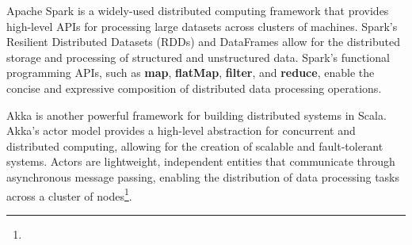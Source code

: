 Apache Spark is a widely-used distributed computing framework that provides high-level APIs for processing large datasets across clusters of machines. Spark's Resilient Distributed Datasets (RDDs) and DataFrames allow for the distributed storage and processing of structured and unstructured data. Spark's functional programming APIs, such as \textbf{map}, \textbf{flatMap}, \textbf{filter}, and \textbf{reduce}, enable the concise and expressive composition of distributed data processing operations\footnotemark[10].



Akka is another powerful framework for building distributed systems in Scala. Akka's actor model provides a high-level abstraction for concurrent and distributed computing, allowing for the creation of scalable and fault-tolerant systems. Actors are lightweight, independent entities that communicate through asynchronous message passing, enabling the distribution of data processing tasks across a cluster of nodes\footnote[10]{}.

